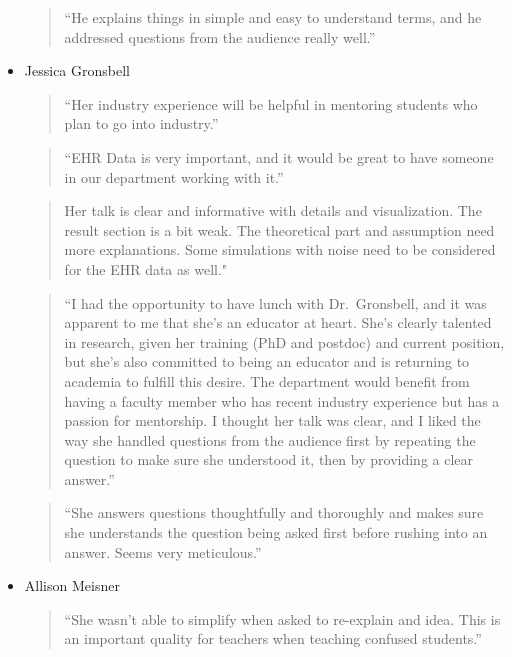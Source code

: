 \documentclass[]{article}
\begin{document}
\begin{itemize}
  \begin{quote}
  ``He explains things in simple and easy to understand terms, and he
  addressed questions from the audience really well.''
  \end{quote}
\item
  Jessica Gronsbell

  \begin{quote}
  ``Her industry experience will be helpful in mentoring students who
  plan to go into industry.''
  \end{quote}

  \begin{quote}
  ``EHR Data is very important, and it would be great to have someone in
  our department working with it.''
  \end{quote}

  \begin{quote}
  Her talk is clear and informative with details and visualization. The
  result section is a bit weak. The theoretical part and assumption need
  more explanations. Some simulations with noise need to be considered
  for the EHR data as well."
  \end{quote}

  \begin{quote}
  ``I had the opportunity to have lunch with Dr.~Gronsbell, and it was
  apparent to me that she's an educator at heart. She's clearly talented
  in research, given her training (PhD and postdoc) and current
  position, but she's also committed to being an educator and is
  returning to academia to fulfill this desire. The department would
  benefit from having a faculty member who has recent industry
  experience but has a passion for mentorship. I thought her talk was
  clear, and I liked the way she handled questions from the audience
  first by repeating the question to make sure she understood it, then
  by providing a clear answer.''
  \end{quote}

  \begin{quote}
  ``She answers questions thoughtfully and thoroughly and makes sure she
  understands the question being asked first before rushing into an
  answer. Seems very meticulous.''
  \end{quote}
\item
  Allison Meisner

  \begin{quote}
  ``She wasn't able to simplify when asked to re-explain and idea. This
  is an important quality for teachers when teaching confused
  students.''
  \end{quote}


\end{itemize}
\end{document}

